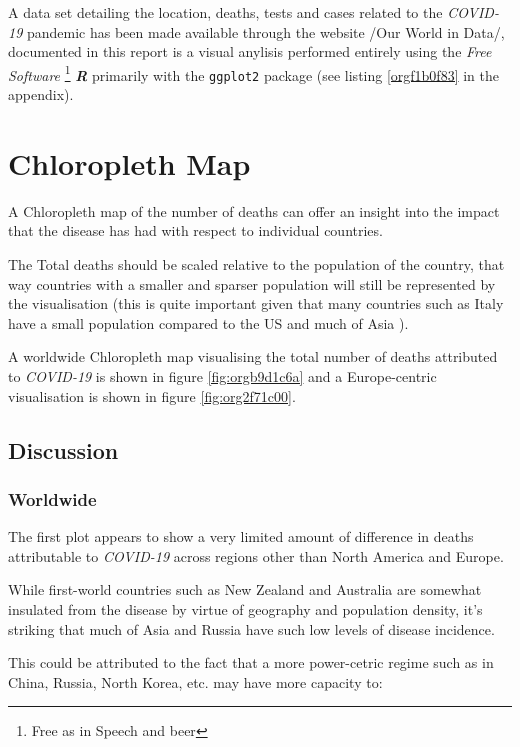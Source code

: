 \documentclass[11pt]{article}
\begin{document}
A data set detailing the location, deaths, tests and cases related to the
\emph{COVID-19} pandemic has been made available through the website /Our World in
Data/\cite{ritchie2020}, documented in this report is a visual anylisis
performed entirely using the \emph{Free Software} \footnote{Free as in Speech and beer} \textbf{\emph{R}} \cite{rcoreteam2020}
primarily with the \texttt{ggplot2} package \cite{wickham2016} (see listing \ref{orgf1b0f83} in the
appendix).

\section{Chloropleth Map}
\label{sec:orgb778a6e}
A Chloropleth map of the number of deaths can offer an insight into the impact
that the disease has had with respect to individual countries.

The Total deaths should be scaled relative to the population of the country,
that way countries with a smaller and sparser population will still be
represented by the visualisation (this is quite important given that many
countries such as Italy have a small population compared to the US and much of
Asia \cite{2020n}).

A worldwide Chloropleth map visualising the total number of deaths attributed to
\emph{COVID-19} is shown in figure \ref{fig:orgb9d1c6a} and a Europe-centric visualisation is shown
in figure \ref{fig:org2f71c00}.

\subsection{Discussion}
\label{sec:org1f4bcf8}
\subsubsection{Worldwide}
\label{sec:orga81a162}
The first plot appears to show a very limited amount of difference in deaths
attributable to \emph{COVID-19} across regions other than North America and
Europe.

While first-world countries such as New Zealand and Australia are
somewhat insulated from the disease by virtue of geography and population
density, it's striking that much of Asia and Russia have such low levels of
disease incidence.

This could be attributed to the fact that a more power-cetric regime such as in
China, Russia, North Korea, etc. may have more capacity to:
\end{document}
